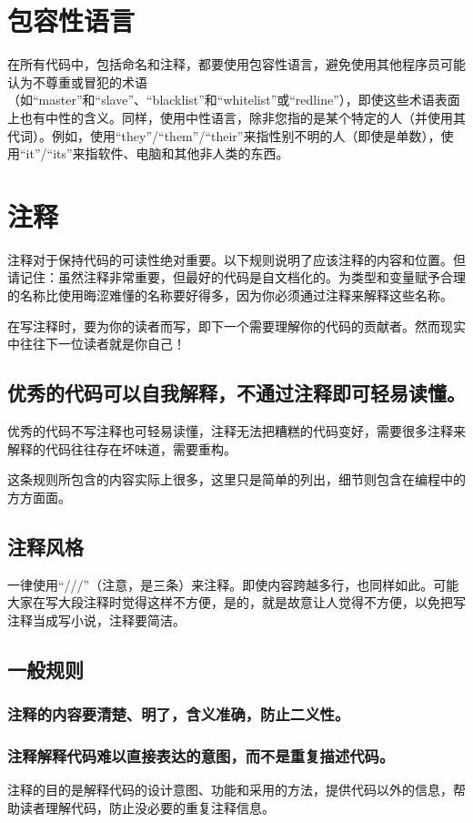 \chapter{包容性语言}
在所有代码中，包括命名和注释，都要使用包容性语言，避免使用其他程序员可能认为不尊重或冒犯的术语（如“master”和“slave”、“blacklist”和“whitelist”或“redline”），即使这些术语表面上也有中性的含义。同样，使用中性语言，除非您指的是某个特定的人（并使用其代词）。例如，使用“they”/“them”/“their”来指性别不明的人（即使是单数），使用“it”/“its”来指软件、电脑和其他非人类的东西。


\chapter{注释}
注释对于保持代码的可读性绝对重要。以下规则说明了应该注释的内容和位置。但请记住：虽然注释非常重要，但最好的代码是自文档化的。为类型和变量赋予合理的名称比使用晦涩难懂的名称要好得多，因为你必须通过注释来解释这些名称。

在写注释时，要为你的读者而写，即下一个需要理解你的代码的贡献者。然而现实中往往下一位读者就是你自己！


\section{优秀的代码可以自我解释，不通过注释即可轻易读懂。}
优秀的代码不写注释也可轻易读懂，注释无法把糟糕的代码变好，需要很多注释来解释的代码往往存在坏味道，需要重构。

这条规则所包含的内容实际上很多，这里只是简单的列出，细节则包含在编程中的方方面面。

\section{注释风格}
一律使用“///”（注意，是三条）来注释。即使内容跨越多行，也同样如此。可能大家在写大段注释时觉得这样不方便，是的，就是故意让人觉得不方便，以免把写注释当成写小说，注释要简洁。


\section{一般规则}

\subsection{注释的内容要清楚、明了，含义准确，防止二义性。}

\subsection{注释解释代码难以直接表达的意图，而不是重复描述代码。}
注释的目的是解释代码的设计意图、功能和采用的方法，提供代码以外的信息，帮助读者理解代码，防止没必要的重复注释信息。

